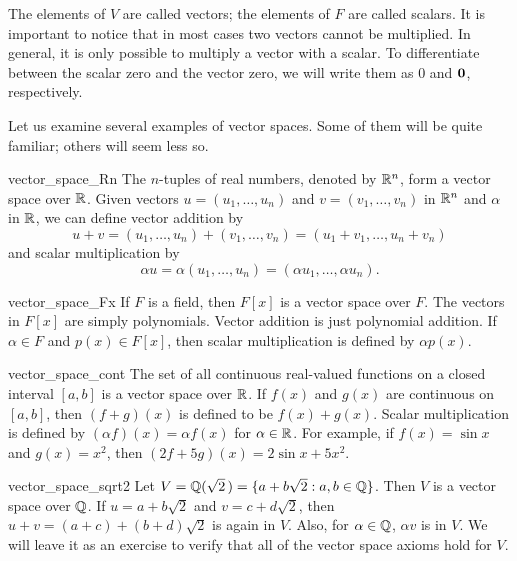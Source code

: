 The elements of $V$ are called {\bfi vectors}; the elements of $F$
are called {\bfi scalars}.  It is important to notice that in most
cases two vectors cannot be multiplied.  In general, it is only
possible to multiply a vector with a scalar. To differentiate between
the scalar zero and the vector zero, we will write them as 0 and
${\bold 0}$, respectively.  


Let us examine several examples of vector spaces. Some of them will be
quite familiar; others will seem less so.
 
 
\begin{example}{vector_space_Rn}
The $n$-tuples of real numbers, denoted by ${\Bbb R}^n$, form a vector
space over ${\Bbb R}$. Given vectors $u = (u_1, \ldots, u_n)$ and $v =
(v_1, \ldots, v_n)$ in ${\Bbb R}^n$ and $\alpha$ in ${\Bbb R}$, we can
define vector addition by
\[
u + v = (u_1, \ldots, u_n) + (v_1, \ldots, v_n)
=
(u_1 + v_1, \ldots, u_n + v_n)
\]
and scalar multiplication by 
\[
\alpha u = \alpha(u_1, \ldots, u_n)= (\alpha u_1, \ldots, \alpha u_n).
\]
\end{example}
 
 
 
\begin{example}{vector_space_Fx}
If $F$ is a field, then $F[x]$ is a vector space over $F$. The vectors
in $F[x]$ are simply polynomials.  Vector addition is just polynomial
addition. If $\alpha \in F$ and $p(x) \in F[x]$, then scalar
multiplication is defined by $\alpha p(x)$.
\end{example}
 
 
\begin{example}{vector_space_cont}
The set of all continuous real-valued functions on a closed interval
$[a,b]$ is a vector space over ${\Bbb R}$.  If $f(x)$ and $g(x)$ are
continuous on $[a, b]$, then $(f+g)(x)$ is defined to be $f(x) +
g(x)$.  Scalar multiplication is defined by
$(\alpha f)(x) = \alpha f(x)$ for $\alpha \in 
{\Bbb R}$. For example, if $f(x) = \sin x$ and $g(x)= x^2$, then 
$(2f+5g)(x) =2 \sin x + 5 x^2$. 
\end{example}
 

 
\begin{example}{vector_space_sqrt2}
Let $V = {\Bbb Q}(\sqrt{2}\, ) = \{ a + b \sqrt{2} : a, b \in 
{\Bbb Q } \}$. Then $V$ is a
vector space over ${\Bbb Q}$. If $u = a + b \sqrt{2}$ and $v = c + d
\sqrt{2}$, then $u + v = (a + c) + (b + d ) \sqrt{2}$ is again in $V$.
Also, for $\alpha \in {\Bbb Q}$, $\alpha v$ is in $V$.  We will leave
it as an exercise to verify that all of the vector space axioms hold
for $V$. 
\end{example}

